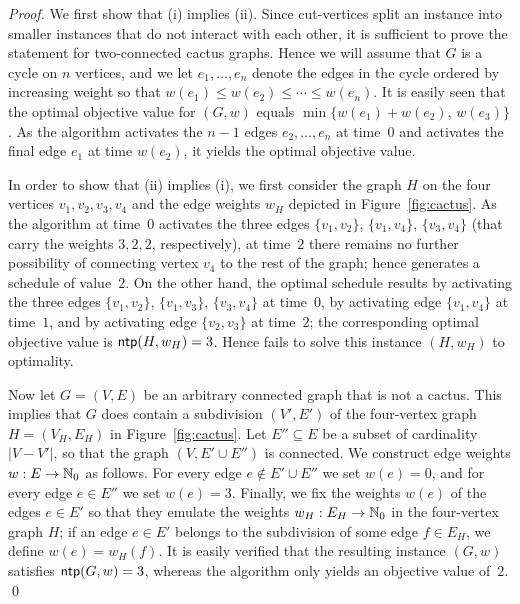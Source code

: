 \begin{proof}
We first show that (i) implies (ii).
Since cut-vertices split an {\xxxNTP} instance into smaller instances that do not interact 
with each other, it is sufficient to prove the statement for two-connected cactus graphs.
Hence we will assume that $G$ is a cycle on $n$ vertices, and we let $e_1,\ldots,e_n$ 
denote the edges in the cycle ordered by increasing weight so that 
$w(e_1)\le w(e_2)\le\cdots\le w(e_n)$.
It is easily seen that the optimal objective value for $(G,w)$ equals 
$\min\{w(e_1)+w(e_2),\,w(e_3)\}$.
As the {\greedy} algorithm activates the $n-1$ edges $e_2,\ldots,e_n$ at time~$0$ and 
activates the final edge $e_1$ at time $w(e_2)$, it yields the optimal objective value.

In order to show that (ii) implies (i), we first consider the graph $H$ on the four
vertices $v_1,v_2,v_3,v_4$ and the edge weights $w_H$ depicted in Figure~\ref{fig:cactus}.
As the {\greedy} algorithm at time~$0$ activates the three edges $\{v_1,v_2\}$, $\{v_1,v_4\}$, 
$\{v_3,v_4\}$ (that carry the weights $3,2,2$, respectively), at time~$2$ there remains no 
further possibility of connecting vertex $v_4$ to the rest of the graph; hence {\greedy} 
generates a schedule of value~$2$.
On the other hand, the optimal schedule results by activating the three edges $\{v_1,v_2\}$, 
$\{v_1,v_3\}$, $\{v_3,v_4\}$ at time~$0$, by activating edge $\{v_1,v_4\}$ at time~$1$,
and by activating edge $\{v_2,v_3\}$ at time~$2$; the corresponding optimal objective
value is $\operatorname{\textsf{ntp}}(H,w_H)=3$.
Hence {\greedy} fails to solve this instance $(H,w_H)$ to optimality.

Now let $G=(V,E)$ be an arbitrary connected graph that is not a cactus. 
This implies that $G$ does contain a subdivision $(V',E')$ of the four-vertex 
graph $H=(V_H,E_H)$ in Figure~\ref{fig:cactus}.
Let $E''\subseteq E$ be a subset of cardinality $|V-V'|$, so that the graph $(V,E'\cup E'')$
is connected.
We construct edge weights $w:E\to\mathbb{N}_0$ as follows.
For every edge $e\notin E'\cup E''$ we set $w(e)=0$, and
for every edge $e\in E''$ we set $w(e)=3$.
Finally, we fix the weights $w(e)$ of the edges $e\in E'$ so that they emulate the 
weights $w_H:E_H\to\mathbb{N}_0$ in the four-vertex graph $H$; if an edge $e\in E'$ belongs to the 
subdivision of some edge $f\in E_H$, we define $w(e)=w_H(f)$.
It is easily verified that the resulting instance $(G,w)$ satisfies $\operatorname{\textsf{ntp}}(G,w)=3$,
whereas the {\greedy} algorithm only yields an objective value of~$2$.
\qed
\end{proof}


